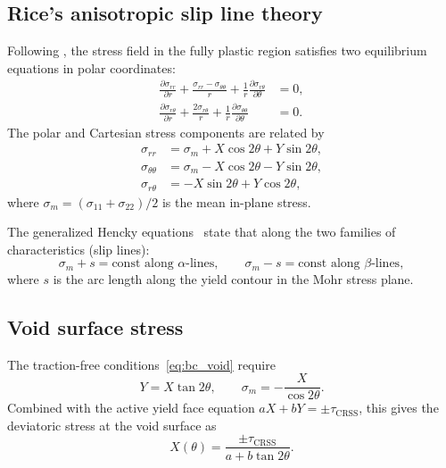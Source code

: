 \documentclass{svjour3} %
\newcommand{\tcrss}{\tau_{\mathrm{CRSS}}}
\newcommand{\srr}{\sigma_{rr}}
\newcommand{\stt}{\sigma_{\theta\theta}}
\newcommand{\srt}{\sigma_{r\theta}}
\newcommand{\sm}{\sigma_m}
\begin{document}
\subsection{Rice's anisotropic slip line theory}

Following \citet{rice1973}, the stress field in the fully plastic region
satisfies two equilibrium equations in polar coordinates:
\begin{align}
\label{eq:equil1}
\frac{\partial \srr}{\partial r}
  + \frac{\srr - \stt}{r}
  + \frac{1}{r}\frac{\partial \srt}{\partial \theta} &= 0, \\
\label{eq:equil2}
\frac{\partial \srt}{\partial r}
  + \frac{2\srt}{r}
  + \frac{1}{r}\frac{\partial \stt}{\partial \theta} &= 0.
\end{align}
The polar and Cartesian stress components are related by
\begin{align}
\label{eq:polar_cart}
\srr &= \sm + X\cos 2\theta + Y\sin 2\theta, \\
\stt &= \sm - X\cos 2\theta - Y\sin 2\theta, \\
\srt &= -X\sin 2\theta + Y\cos 2\theta,
\end{align}
where $\sm = (\sigma_{11} + \sigma_{22})/2$ is the mean in-plane stress.

The generalized Hencky equations~\citep{rice1973} state that along the
two families of characteristics (slip lines):
\begin{equation}
\label{eq:hencky}
\sm + s = \text{const along } \alpha\text{-lines}, \qquad
\sm - s = \text{const along } \beta\text{-lines},
\end{equation}
where $s$ is the arc length along the yield contour in the Mohr stress
plane.

\subsection{Void surface stress}

The traction-free conditions~\eqref{eq:bc_void} require
\begin{equation}
\label{eq:void_constraint}
Y = X\tan 2\theta, \qquad
\sm = -\frac{X}{\cos 2\theta}.
\end{equation}
Combined with the active yield face equation $aX + bY = \pm\tcrss$,
this gives the deviatoric stress at the void surface as
\begin{equation}
\label{eq:X_void}
X(\theta) = \frac{\pm\tcrss}{a + b\tan 2\theta}.
\end{equation}
\end{document}
